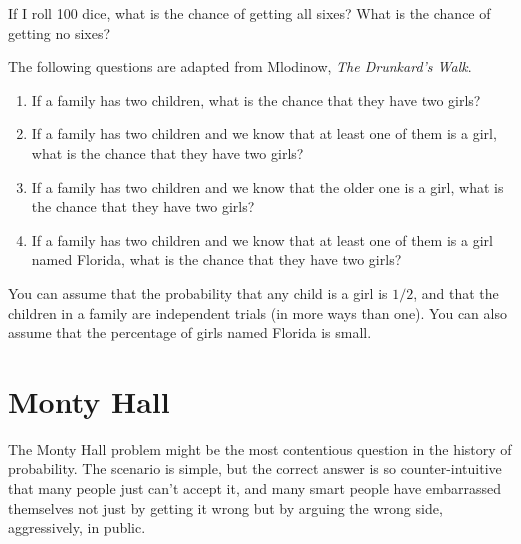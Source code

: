 \documentclass[12pt]{book}
\begin{document}
\begin{ex}
If I roll 100 dice, what is the chance of getting all sixes?
What is the chance of getting no sixes?
\end{ex}

\begin{ex}


The following questions are adapted from Mlodinow, {\em The Drunkard's
  Walk}.

\begin{enumerate}

\item If a family has two children, what is the chance that they
  have two girls?

\item If a family has two children and we know that at least one of
  them is a girl, what is the chance that they have two girls?

\item If a family has two children and we know that the older one is a
  girl, what is the chance that they have two girls?

\item If a family has two children and we know that at least one of
  them is a girl named Florida, what is the chance that they have
  two girls?

\end{enumerate}

You can assume that the probability that any child is a girl is $1/2$,
and that the children in a family are independent trials (in more ways
than one).  You can also assume that the percentage of girls named
Florida is small.

\end{ex}


\section{Monty Hall}


The Monty Hall problem might be the most contentious question in
the history of probability.  The scenario is simple, but the correct
answer is so counter-intuitive that many people just can't accept
it, and many smart people have embarrassed themselves not just by
getting it wrong but by arguing the wrong side, aggressively,
in public.
\end{document}

